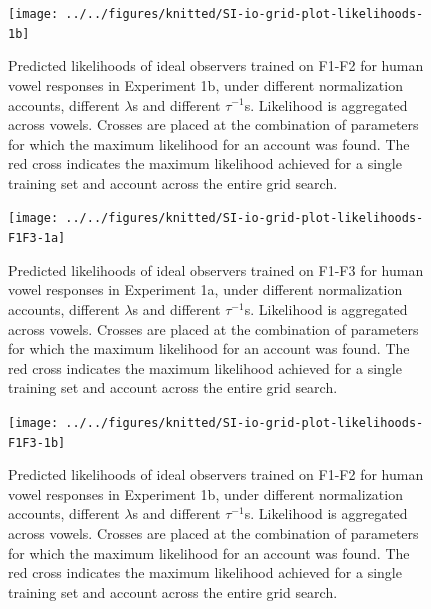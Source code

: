 \documentclass[preprint]{JASA}
\begin{document}
\begin{figure}

{\centering \texttt{[image: ../../figures/knitted/SI-io-grid-plot-likelihoods-1b]} 

}

\caption{Predicted likelihoods of ideal observers trained on F1-F2 for human vowel responses in Experiment 1b, under different normalization accounts, different \(\lambda\)s and different \(\tau^{-1}\)s. Likelihood is aggregated across vowels. Crosses are placed at the combination of parameters for which the maximum likelihood for an account was found. The red cross indicates the maximum likelihood achieved for a single training set and account across the entire grid search.}\label{fig:SI-io-grid-plot-likelihoods-1b}
\end{figure}



\begin{figure}

{\centering \texttt{[image: ../../figures/knitted/SI-io-grid-plot-likelihoods-F1F3-1a]} 

}

\caption{Predicted likelihoods of ideal observers trained on F1-F3 for human vowel responses in Experiment 1a, under different normalization accounts, different \(\lambda\)s and different \(\tau^{-1}\)s. Likelihood is aggregated across vowels. Crosses are placed at the combination of parameters for which the maximum likelihood for an account was found. The red cross indicates the maximum likelihood achieved for a single training set and account across the entire grid search.}\label{fig:SI-io-grid-plot-likelihoods-F1F3-1a}
\end{figure}



\begin{figure}

{\centering \texttt{[image: ../../figures/knitted/SI-io-grid-plot-likelihoods-F1F3-1b]} 

}

\caption{Predicted likelihoods of ideal observers trained on F1-F2 for human vowel responses in Experiment 1b, under different normalization accounts, different \(\lambda\)s and different \(\tau^{-1}\)s. Likelihood is aggregated across vowels. Crosses are placed at the combination of parameters for which the maximum likelihood for an account was found. The red cross indicates the maximum likelihood achieved for a single training set and account across the entire grid search.}\label{fig:SI-io-grid-plot-likelihoods-F1F3-1b}
\end{figure}
\end{document}
